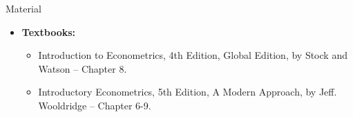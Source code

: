 \documentclass[notes,10pt, aspectratio=169]{beamer}
\begin{document}
\begin{frame}[allowframebreaks]{Material}
\begin{itemize}
    \item[--] \textbf{Textbooks:}
    \begin{itemize}
        \item Introduction to Econometrics, 4th Edition, Global Edition, by Stock and Watson -- Chapter 8.
        \item Introductory Econometrics, 5th Edition, A Modern Approach, by Jeff. Wooldridge -- Chapter 6-9.
    \end{itemize}
\end{itemize}
\scriptsize{

 
}
\end{frame}
\end{document}
